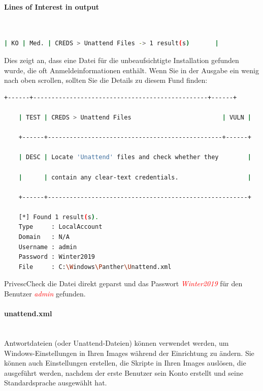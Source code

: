 \paragraph{Lines of Interest in output}\mbox{} \\

\begin{lstlisting}[language=bash]
    | KO | Med. | CREDS > Unattend Files -> 1 result(s)       |
\end{lstlisting}

Dies zeigt an, dass eine Datei für die unbeaufsichtigte Installation gefunden wurde, die oft Anmeldeinformationen enthält. Wenn Sie in der Ausgabe ein wenig nach oben scrollen, sollten Sie die Details zu diesem Fund finden:

\begin{lstlisting}[language=bash]
    +------+------------------------------------------------+------+

    | TEST | CREDS > Unattend Files                         | VULN |

    +------+------------------------------------------------+------+

    | DESC | Locate 'Unattend' files and check whether they        |

    |      | contain any clear-text credentials.                   |

    +------+-------------------------------------------------------+

    [*] Found 1 result(s).
    Type     : LocalAccount
    Domain   : N/A
    Username : admin
    Password : Winter2019
    File     : C:\Windows\Panther\Unattend.xml
\end{lstlisting}

PrivescCheck die Datei direkt geparst und das Passwort \textcolor{red}{\textit{Winter2019}} für den Benutzer \textcolor{red}{\textit{admin}} gefunden.

\paragraph{unattend.xml}\mbox{} \\
Antwortdateien (oder Unattend-Dateien) können verwendet werden, um Windows-Einstellungen in Ihren Images während der Einrichtung zu ändern. Sie können auch Einstellungen erstellen, die Skripte in Ihren Images auslösen, die ausgeführt werden, nachdem der erste Benutzer sein Konto erstellt und seine Standardsprache ausgewählt hat.



